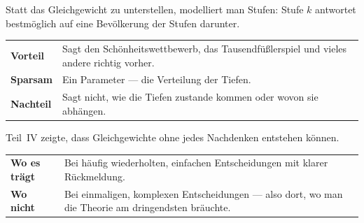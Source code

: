 \begin{merksatz}
Statt das Gleichgewicht zu unterstellen, modelliert man Stufen: Stufe $k$ antwortet bestmöglich auf eine Bevölkerung der Stufen darunter.

\begin{center}
{\small
\renewcommand{\arraystretch}{1.5}
\begin{tabular}{@{}P{2.4cm}P{6.2cm}@{}}
\toprule
\textbf{Vorteil} & Sagt den Schönheitswettbewerb, das Tausendfüßlerspiel und vieles andere richtig vorher.\\
\textbf{Sparsam} & Ein Parameter --- die Verteilung der Tiefen.\\
\textbf{Nachteil} & Sagt nicht, wie die Tiefen zustande kommen oder wovon sie abhängen.\\
\bottomrule
\end{tabular}}
\end{center}

\begin{center}
\begin{minipage}{0.88\textwidth}
\end{minipage}
\end{center}
\end{merksatz}

\begin{merksatz}
Teil~IV zeigte, dass Gleichgewichte ohne jedes Nachdenken entstehen können.

\begin{center}
{\small
\renewcommand{\arraystretch}{1.5}
\begin{tabular}{@{}P{2.4cm}P{6.2cm}@{}}
\toprule
\textbf{Wo es trägt} & Bei häufig wiederholten, einfachen Entscheidungen mit klarer Rückmeldung.\\
\textbf{Wo nicht} & Bei einmaligen, komplexen Entscheidungen --- also dort, wo man die Theorie am dringendsten bräuchte.\\
\bottomrule
\end{tabular}}
\end{center}

\begin{center}
\begin{minipage}{0.88\textwidth}
\end{minipage}
\end{center}
\end{merksatz}

